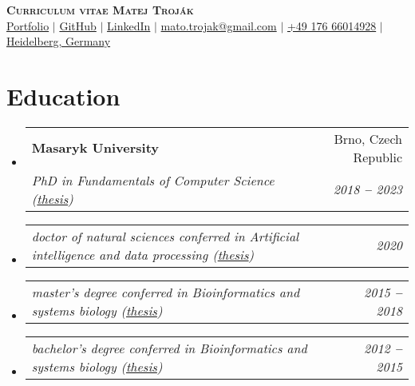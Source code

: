 \documentclass[letterpaper,11pt]{article}
\makeatletter
\newcommand{\resumeSubheading}[4]{
  \vspace{-2pt}\item
    \begin{tabular*}{0.97\textwidth}[t]{l@{\extracolsep{\fill}}r}
      \textbf{#1} & #2 \\
      \textit{\small#3} & \textit{\small #4} \\
    \end{tabular*}\vspace{-7pt}
}
\newcommand{\resumeSubSubheading}[2]{
    \vspace{-2pt}\item
    \begin{tabular*}{0.97\textwidth}{l@{\extracolsep{\fill}}r}
      \textit{\small#1} & \textit{\small #2} \\
    \end{tabular*}\vspace{-7pt}
}
\newcommand{\resumeSubHeadingListStart}{\begin{itemize}[leftmargin=0.15in, label={}]}
\newcommand{\resumeSubHeadingListEnd}{\end{itemize}}
\makeatother
\begin{document}

\begin{center}
  \textbf{\Huge \scshape \hspace*{20pt} Curriculum vitae \hfill \LARGE Matej Troják \hspace*{20pt}} \\ \vspace{3pt}
  \small
  \faGlobe \hspace{.5pt} \href{https://xtrojak.github.io}{Portfolio}
  $|$
  \faGithub \hspace{.5pt} \href{https://github.com/xtrojak}{GitHub}
  $|$
  \faLinkedinSquare \hspace{.5pt} \href{https://linkedin.com/in/matej-troj%C3%A1k-3b1229179}{LinkedIn}
  $|$
  \faEnvelopeO \hspace{.5pt} \href{mailto:mato.trojak@gmail.com}{mato.trojak@gmail.com}
  $|$
  \faMobile \hspace{.5pt} \href{tel:4917666014928}{+49 176 66014928}
  $|$
  \faMapMarker \hspace{.5pt} \href{https://goo.gl/maps/rqsk3bDELMWajqJe9}{Heidelberg, Germany}
\end{center}



\section{Education}
  \vspace{3pt}
  \resumeSubHeadingListStart

  \resumeSubheading
  {Masaryk University
  }{Brno, Czech Republic}
  {PhD in Fundamentals of Computer Science (\href{https://is.muni.cz/th/m3qym/?lang=en}{thesis})}{2018 \textbf{--} 2023}

  \resumeSubSubheading{doctor of natural sciences conferred in Artificial intelligence and data processing (\href{https://is.muni.cz/auth/th/lc8hj/?lang=en}{thesis})}{2020}

  \resumeSubSubheading{master's degree conferred in Bioinformatics and systems biology (\href{https://is.muni.cz/th/lgs7n/?lang=en;setlang=en}{thesis})}{2015 \textbf{--} 2018}

  \resumeSubSubheading{bachelor's degree conferred in Bioinformatics and systems biology (\href{https://is.muni.cz/th/nhf6y/?lang=en;setlang=en}{thesis})}{2012 \textbf{--} 2015}

  
  \resumeSubHeadingListEnd
\end{document}
